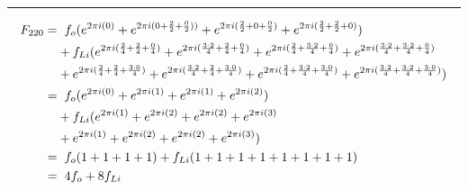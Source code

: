 \documentclass{article}
\begin{document}
\noindent\rule{12cm}{0.4pt}
\begin{align*}
	F_{220} =& \hspace{0.2cm}  f_{o}  (e^{2 \pi i (0)} 
	+ e^{2 \pi i (0 + \frac{2}{2} + \frac{0}{2}))} 
	+ e^{2 \pi i (\frac{2}{2} + 0 + \frac{0}{2})} 
	+ e^{2 \pi i (\frac{2}{2} + \frac{2}{2} + 0)})  \\
	&+ f_{Li} (e^{2 \pi i (\frac{2}{4} + \frac{2}{4} + \frac{0}{4})}  
	+ e^{2 \pi i (\frac{3 \cdot 2}{4} + \frac{2}{4} + \frac{0}{4})} 
	+ e^{2 \pi i (\frac{2}{4} + \frac{3 \cdot 2}{4} + \frac{0}{4})} 
	+ e^{2 \pi i (\frac{3 \cdot 2}{4} + \frac{3 \cdot 2}{4} + \frac{0}{4})} \\
	&+ e^{2 \pi i (\frac{2}{4} + \frac{2}{4} + \frac{3 \cdot 0}{4})}
	+ e^{2 \pi i (\frac{3 \cdot 2}{4} + \frac{2}{4} + \frac{3 \cdot 0}{4})} 
	+ e^{2 \pi i (\frac{2}{4} + \frac{3 \cdot 2}{4} + \frac{3 \cdot 0}{4})} 
	+ e^{2 \pi i (\frac{3 \cdot 2}{4} + \frac{3 \cdot 2}{4} + \frac{3 \cdot 0}{4})}) \\  
	=& \hspace{0.2cm}  f_{o}  (e^{2 \pi i (0)} 
	+ e^{2 \pi i (1)} 
	+ e^{2 \pi i (1)} 
	+ e^{2 \pi i (2)})  \\
	&+ f_{Li} (e^{2 \pi i (1)}  
	+ e^{2 \pi i (2)} 
	+ e^{2 \pi i (2)} 
	+ e^{2 \pi i (3)} \\
	&+ e^{2 \pi i (1)}
	+ e^{2 \pi i (2)} 
	+ e^{2 \pi i (2)} 
	+ e^{2 \pi i (3)}) \\
	=& \hspace{0.2cm}  f_{o}  (1  + 1 + 1 + 1) + f_{Li}(1 + 1 + 1 + 1 + 1 + 1 + 1 + 1) \\
	=& \hspace{0.2cm} 4f_{o}   + 8f_{Li}
\end{align*}
\end{document}
